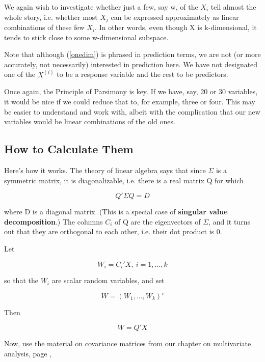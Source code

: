 We again wish to investigate whether just a few, say w, of the $X_i$ tell
almost the whole story, i.e. whether most $X_j$ can be expressed
approximately as linear combinations of these few $X_i$.  In other
words, even though X is k-dimensional, it tends to stick close to some
w-dimensional subspace.

Note that although (\ref{onedim}) is phrased in prediction terms, we are
not (or more accurately, not necessarily) interested in prediction here.
We have not designated one of the $X^{(i)}$ to be a response variable
and the rest to be predictors.

Once again, the Principle of Parsimony is key.  If we have, say, 20 or
30 variables, it would be nice if we could reduce that to, for example,
three or four.  This may be easier to understand and work with, albeit
with the complication that our new variables would be linear
combinations of the old ones.

\subsection{How to Calculate Them}

Here's how it works.  The theory of linear algebra says that since $\Sigma$
is a symmetric matrix, it is diagonalizable, i.e. there is a real matrix Q
for which 

\begin{equation}
\label{qsigq}
Q' \Sigma Q = D
\end{equation}

where D is a diagonal matrix.  (This is a special case of {\bf singular
value decomposition}.) The columns $C_i$ of Q are the eigenvectors of
$\Sigma$, and it turns out that they are orthogonal to each other, i.e.
their dot product is 0.

Let 

\begin{equation}
W_i = C_i'X, ~ i = 1,...,k
\end{equation}

so that the $W_i$ are scalar random variables, and set 

\begin{equation}
W = (W_1,...,W_k)'
\end{equation}

Then

\begin{equation}
W = Q' X
\end{equation}

Now, use the material on covariance matrices from our chapter on
multivariate analysis, page \pageref{covawaprime},

